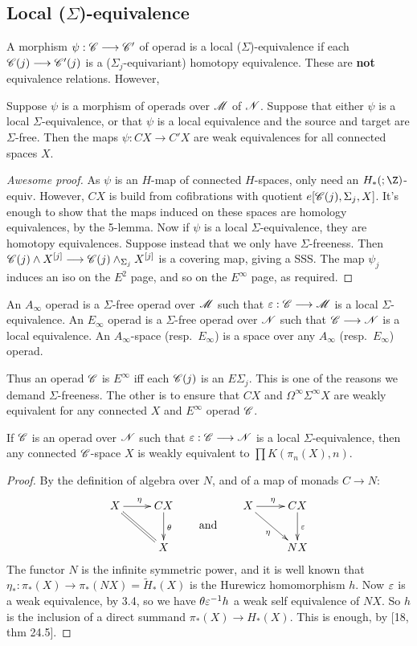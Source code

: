 \documentclass[11pt]{article}
\begin{document}
\subsection{Local (\texorpdfstring{$\Sigma$}{Sigma})-equivalence}
A morphism $\psi:\mathscr{C}\longrightarrow\mathscr{C}'$ of operad is a local ($\Sigma$)-equivalence if
each $\mathscr{C}(j)\longrightarrow\mathscr{C}'(j)$ is a ($\Sigma_j$-equivariant) homotopy equivalence.
These are \textbf{not} equivalence relations. However,
\begin{prop*}
Suppose $\psi$ is a morphism of operads over $\mathscr{M}$ of $\mathscr{N}$. Suppose that
either $\psi$ is a local $\Sigma$-equivalence, or that $\psi$ is a local
equivalence and the source and target are $\Sigma$-free. Then the maps
$\psi:CX\to C'X$ are weak equivalences for all connected spaces $X$.
\end{prop*}
\begin{proof}[Awesome proof]
As $\psi$ is an $H$-map of connected $H$-spaces, only need an $H_*(;\Z)$-equiv.
However, $CX$ is build from cofibrations with quotient $e[\mathscr{C}(j),\Sigma_j,X]$.
It's enough to show that the maps induced on these spaces are homology
equivalences, by the 5-lemma. Now if $\psi$ is a local $\Sigma$-equivalence, 
they are homotopy equivalences. Suppose instead that we only have $\Sigma$-freeness.
Then $\mathscr{C}(j)\wedge X^{[j]}\longrightarrow\mathscr{C}(j)\wedge_{\Sigma_j} X^{[j]}$ is a covering
map, giving a SSS. The map $\psi_j$ induces an iso on the $E^2$ page, and so
on the $E^\infty$ page, as required.
\end{proof}
\begin{defn*}[3.5]
An $A_\infty$ operad is a $\Sigma$-free operad over $\mathscr{M}$ such that
$\varepsilon:\mathscr{C}\longrightarrow\mathscr{M}$ is a local $\Sigma$-equivalence.
An $E_\infty$ operad is a $\Sigma$-free operad over $\mathscr{N}$ such that 
$\mathscr{C}\longrightarrow\mathscr{N}$ is a local equivalence.
 An $A_\infty$-space 
(resp.\ $E_\infty$) is a space over any $A_\infty$ (resp.\ $E_\infty$) operad.
\end{defn*}\noindent
Thus an operad $\mathscr{C}$ is $E^\infty$ iff each $\mathscr{C}(j)$ is an $E\Sigma_j$. 
This is one of the reasons we demand $\Sigma$-freeness. The other is to ensure
that $CX$ and $\Omega^\infty\Sigma^\infty X$ are weakly equivalent for any
connected $X$ and $E^\infty$ operad $\mathscr{C}$.
\begin{prop*}[3.6]
If $\mathscr{C}$ is an operad over $\mathscr{N}$ such that $\varepsilon:\mathscr{C}\longrightarrow\mathscr{N}$ is a local
$\Sigma$-equivalence, then any connected $\mathscr{C}$-space $X$ is weakly equivalent
to $\prod K(\pi_n(X),n)$.
\end{prop*}
\begin{proof}
By the definition of algebra over $N$, and of a map of monads $C\to N$:
\[\xymatrix{
X\ar[r]^\eta&CX\ar[d]^\theta\\
&X\ar@{=}[ul]
}
\raisebox{-.6cm}{\text{\qquad and\qquad}}
\xymatrix{
X\ar[dr]_{\eta}\ar[r]^\eta&CX\ar[d]^\eps\\
&NX
}\]
The functor $N$ is the infinite symmetric power, and it is well known that
$\eta_*:\pi_*(X)\to\pi_*(NX)=\widetilde H_*(X)$ is the Hurewicz homomorphism $h$.
Now $\varepsilon$ is a weak equivalence, by 3.4, so we have $\theta\varepsilon^{-1}h$ a weak
self equivalence of $NX$. So $h$ is the inclusion of a direct summand
$\pi_*(X)\to H_*(X)$. This is enough, by [18, thm 24.5].
\end{proof}
\end{document}
